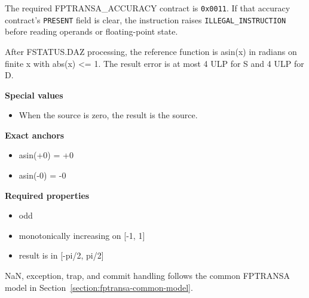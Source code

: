 The required FPTRANSA\_ACCURACY contract is \texttt{0x0011}. If that accuracy contract's \texttt{PRESENT} field is clear, the instruction raises \texttt{ILLEGAL\_INSTRUCTION} before reading operands or floating-point state.

After FSTATUS.DAZ processing, the reference function is asin(x) in radians on finite x with abs(x) \textless{}= 1. The result error is at most 4 ULP for S and 4 ULP for D.

\textbf{Special values}\par
\begin{itemize}
\item When the source is zero, the result is the source.
\end{itemize}

\textbf{Exact anchors}\par
\begin{itemize}
\item asin(+0) = +0
\item asin(-0) = -0
\end{itemize}

\textbf{Required properties}\par
\begin{itemize}
\item odd
\item monotonically increasing on [-1, 1]
\item result is in [-pi/2, pi/2]
\end{itemize}

NaN, exception, trap, and commit handling follows the common FPTRANSA model in Section~\ref{section:fptransa-common-model}.
